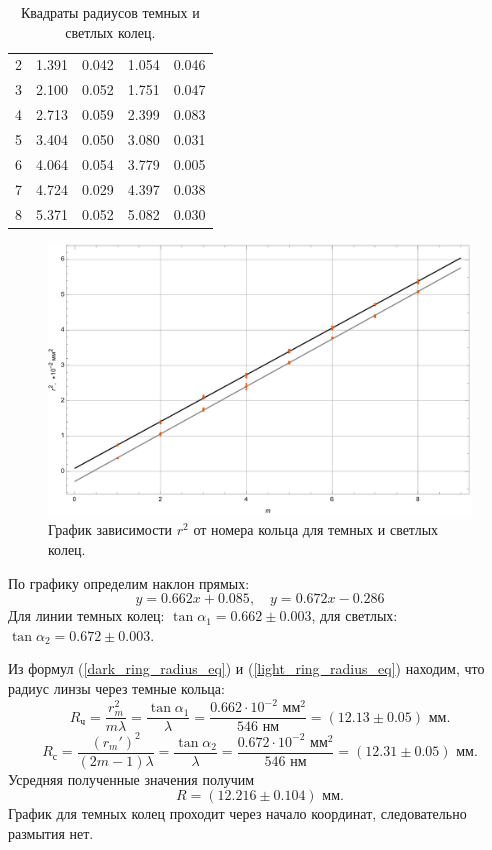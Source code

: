 \documentclass[a4paper, 12pt]{article}
\begin{document}
\begin{enumerate}
\begin{table}[h]
\begin{tabular}{|c|c|c|c|c|}
 					2 & 1.391 & 0.042 & 1.054 & 0.046 \\
 					3 & 2.100 & 0.052 & 1.751 & 0.047 \\
 					4 & 2.713 & 0.059 & 2.399 & 0.083 \\
 					5 & 3.404 & 0.050 & 3.080 & 0.031 \\
 					6 & 4.064 & 0.054 & 3.779 & 0.005 \\
 					7 & 4.724 & 0.029 & 4.397 & 0.038 \\
 					8 & 5.371 & 0.052 & 5.082 & 0.030 \\
 					\hline
				\end{tabular}
				\caption{Квадраты радиусов темных и светлых колец.}
			\end{table}
			\begin{figure}[h]
				\centering
				\includegraphics[scale=0.7]{Graphic.pdf}
				\caption{График зависимости $r^2$ от номера кольца для темных и светлых колец.}
			\end{figure}
			\par
			По графику определим наклон прямых:
			\begin{equation*}
				y=0.662 x+0.085,\quad y=0.672 x-0.286
			\end{equation*}
			Для линии темных колец: $\tan\alpha_{1}=0.662\pm 0.003$, для светлых: $\tan\alpha_{2}=0.672\pm 0.003$.\par
			Из формул (\ref{dark_ring_radius_eq}) и (\ref{light_ring_radius_eq}) находим, что радиус линзы через темные кольца:
			\begin{equation*}
				R_\text{ч}=\frac{r_m^2}{m\lambda}=\frac{\tan\alpha_1}{\lambda}=\frac{0.662\cdot10^{-2} \text{ мм}^2}{546\text{ нм}}=(12.13\pm0.05) \text{ мм}.
			\end{equation*}
			\begin{equation*}
				R_\text{с}=\frac{(r_m')^2}{(2m-1)\lambda}=\frac{\tan\alpha_2}{\lambda}=\frac{0.672\cdot10^{-2} \text{ мм}^2}{546\text{ нм}}=(12.31\pm0.05)\text{ мм}.
			\end{equation*}
			Усредняя полученные значения получим
			\begin{equation*}
				R=(12.216\pm0.104)\text{ мм}.
			\end{equation*}
			График для темных колец проходит через начало координат, следовательно размытия нет.

\end{enumerate}
\end{document}
